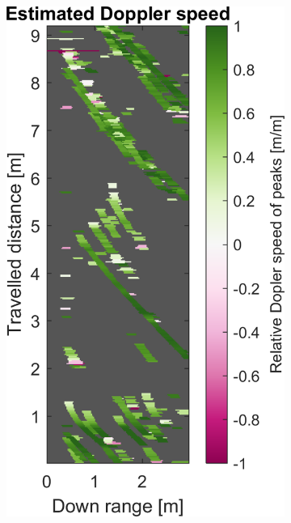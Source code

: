 \begin{figure}[htbp]
\begin{subfigure}[t]{0.475\linewidth}
        \includegraphics[width=\linewidth,max height=.475\textheight]{gfx/results/mancave_doppler.png}
    \end{subfigure}\bigskip\\
    \begin{subfigure}[t]{0.475\linewidth}  
        \centering 

\end{subfigure}
\end{figure}
